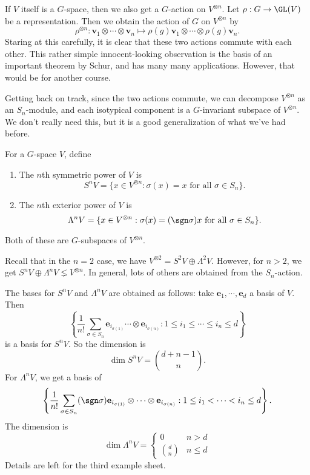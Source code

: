 \documentclass[a4paper]{article}
\begin{document}
If $V$ itself is a $G$-space, then we also get a $G$-action on $V^{\otimes n}$. Let $\rho: G \to \GL(V)$ be a representation. Then we obtain the action of $G$ on $V^{\otimes n}$ by
\[
  \rho^{\otimes n}: \mathbf{v}_1 \otimes \cdots \otimes \mathbf{v}_n \mapsto \rho(g) \mathbf{v}_1 \otimes \cdots \otimes \rho(g) \mathbf{v}_n.
\]
Staring at this carefully, it is clear that these two actions commute with each other. This rather simple innocent-looking observation is the basis of an important theorem by Schur, and has many many applications. However, that would be for another course.

Getting back on track, since the two actions commute, we can decompose $V^{\otimes n}$ as an $S_n$-module, and each isotypical component is a $G$-invariant subspace of $V^{\otimes n}$. We don't really need this, but it is a good generalization of what we've had before.

\begin{defi} 
  For a $G$-space $V$, define
  \begin{enumerate}
    \item The $n$th symmetric power of $V$ is
      \[
        S^n V = \{x \in V^{\otimes n}: \sigma(x) = x\text{ for all }\sigma \in S_n\}.
      \]
    \item The $n$th exterior power of $V$ is
      \[
        \Lambda^n V = \{x \in V^{\otimes n}: \sigma(x) = (\sgn \sigma) x \text{ for all }\sigma \in S_n\}.
      \]
  \end{enumerate}
  Both of these are $G$-subspaces of $V^{\otimes n}$.
\end{defi}
Recall that in the $n = 2$ case, we have $V^{\otimes 2} = S^2 V \oplus \Lambda^2 V$. However, for $n > 2$, we get $S^n V \oplus \Lambda^n V \lneq V^{\otimes n}$. In general, lots of others are obtained from the $S_n$-action.

\begin{eg}
  The bases for $S^n V$ and $\Lambda^n V$ are obtained as follows: take $\mathbf{e}_1, \cdots, \mathbf{e}_d$ a basis of $V$. Then
  \[
    \left\{\frac{1}{n!}\sum_{\sigma \in S_n} \mathbf{e}_{i_{\sigma(1)}} \cdots \otimes \mathbf{e}_{i_{\sigma(n)}} : 1 \leq i_1 \leq \cdots \leq i_n \leq d\right\}
  \]
  is a basis for $S^n V$. So the dimension is
  \[
    \dim S^n V = \binom{d + n - 1}{n}.
  \]
  For $\Lambda^n V$, we get a basis of
  \[
    \left\{\frac{1}{n!} \sum_{\sigma \in S_n} (\sgn \sigma) \mathbf{e}_{i_{\sigma(1)}} \otimes \cdots \otimes \mathbf{e}_{i_{\sigma(n)}}: 1 \leq i_1 < \cdots < i_n \leq d\right\}.
  \]
  The dimension is
  \[
    \dim \Lambda^n V =
    \begin{cases}
      0 & n > d\\
      \binom{d}{n} & n \leq d
    \end{cases}
  \]
  Details are left for the third example sheet.
\end{eg}
\end{document}
